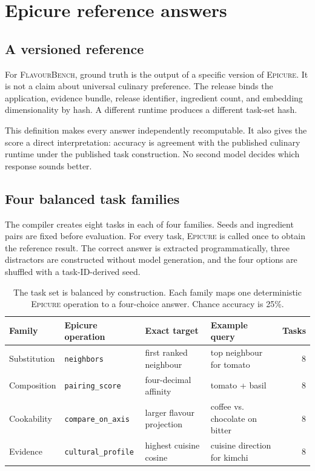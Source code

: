 \documentclass[10pt,twocolumn]{article}
\newcommand{\system}{\textsc{FlavourBench}}
\newcommand{\epicure}{\textsc{Epicure}}
\begin{document}
\section{Epicure reference answers}
\label{sec:oracle}

\subsection{A versioned reference}

For \system{}, ground truth is the output of a specific version of \epicure{}. It is not a claim
about universal culinary preference. The release binds the application, evidence bundle, release
identifier, ingredient count, and embedding dimensionality by hash. A different runtime produces a
different task-set hash.

This definition makes every answer independently recomputable. It also gives the score a direct
interpretation: accuracy is agreement with the published culinary runtime under the published task
construction. No second model decides which response sounds better.

\subsection{Four balanced task families}

The compiler creates eight tasks in each of four families. Seeds and ingredient pairs are fixed
before evaluation. For every task, \epicure{} is called once to obtain the reference result. The
correct answer is extracted programmatically, three distractors are constructed without model
generation, and the four options are shuffled with a task-ID-derived seed.

\begin{table}[t]
  \centering
  \footnotesize
  \setlength{\tabcolsep}{3pt}
  \begin{tabularx}{\linewidth}{@{}l l X X r@{}}
    \toprule
    Family & Epicure operation & Exact target & Example query & Tasks \\
    \midrule
    Substitution & \texttt{neighbors} & first ranked neighbour & top neighbour for tomato & 8 \\
    Composition & \texttt{pairing\_score} & four-decimal affinity & tomato + basil & 8 \\
    Cookability & \texttt{compare\_on\_axis} & larger flavour projection & coffee vs. chocolate on bitter & 8 \\
    Evidence & \texttt{cultural\_profile} & highest cuisine cosine & cuisine direction for kimchi & 8 \\
    \bottomrule
  \end{tabularx}
  \caption{The task set is balanced by construction. Each family maps one deterministic \epicure{}
  operation to a four-choice answer. Chance accuracy is 25\%.}
  \label{tab:tasks}
\end{table}
\end{document}
